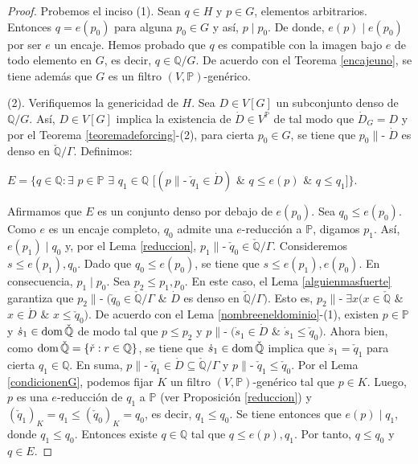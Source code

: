 \documentclass[11pt]{unam_tesis1}
\theoremstyle{MyThmStyle}
\theoremstyle{definition}
\theoremstyle{plain}
\theoremstyle{remark}
\def\dom{\mathop{\rm dom}\nolimits}
\def\forces{\mathop{\parallel\!\!\!-}\nolimits}
\let\Vdash\forces
\let\leq\leqslant
\begin{document}
\begin{proof}
Probemos el inciso (1). Sean $q \in H$ y $p \in G$, elementos arbitrarios. Entonces $q=e(p_0)$ para alguna $p_0\in G$ y as\'i, $p\mid p_0$. De donde, $e(p)\mid e(p_0)$ por ser $e$ un encaje. Hemos probado que $q$ es compatible con la imagen bajo $e$ de todo elemento en $G$, es decir, $q\in \mathbb Q/G$. De acuerdo con el Teorema \ref{encajeuno}, se tiene adem\'as que $G$ es un filtro $(V,\mathbb P)$-gen\'erico.

(2). Verifiquemos la genericidad de $H$. Sea $D\in V[G]$ un subconjunto denso de $\mathbb Q/G$. As\'i, $D \in V[G]$ implica la existencia de $\dot D\in V^{\mathbb P}$ de tal modo que $\dot D_G = D$ y por el Teorema \ref{teoremadeforcing}-(2), para cierta $p_0\in G$, se tiene que $p_0\Vdash \dot D$ es denso en $\mathbb{\check{\mathbb Q}}/\Gamma$. Definimos:
\begin{center}
$E=\{q\in \mathbb Q:\exists$ $p\in \mathbb P$ $\exists$ $q_1\in \mathbb Q$ $[(p\Vdash \check q_1\in \dot D)$ $\&$ $q\leq e(p)$ $\&$ $q\leq q_1] \}$.
\end{center}
Afirmamos que $E$ es un conjunto denso por debajo de $e(p_0)$. Sea $q_0\leq e(p_0)$. Como $e$ es un encaje completo, $q_0$ admite una $e$-reducci\'on a $\mathbb P$, digamos $p_1$. As\'i, $e(p_1)\mid q_0$ y, por el Lema \ref{reduccion}, $p_1\Vdash \check q_0\in \check{\mathbb Q}/\Gamma$. Consideremos $s\leq e(p_1),q_0$. Dado que $q_0\leq e(p_0)$, se tiene que $s\leq e(p_1),e(p_0)$. En consecuencia, $p_1\mid p_0$. Sea $p_2\leq p_1,p_0$. En este caso, el Lema \ref{alguienmasfuerte} garantiza que $p_2\Vdash (\check q_0\in \check{\mathbb Q}/\Gamma$ $\&$ $\dot D$ es denso en $\check{\mathbb Q}/\Gamma)$. Esto es, $p_2\Vdash \exists x(x\in \check{\mathbb Q}$ $\&$ $x\in \dot D$ $\&$ $x\leq \check q_0)$. De acuerdo con el Lema \ref{nombreeneldominio}-(1), existen $p\in \mathbb P$ y $\dot s_1\in \dom \check{\mathbb Q}$ de modo tal que $p\leq p_2$ y $p\Vdash (\dot s_1\in \dot D$ $\&$ $\dot s_1\leq \check q_0)$. Ahora bien, como $\dom \check{\mathbb Q}=\{\check r:r\in \mathbb Q \}$, se tiene que $\dot s_1\in \dom \check{\mathbb Q}$ implica que $\dot s_1=\check q_1$ para cierta $q_1\in \mathbb Q$. En suma, $p\Vdash \check q_1\in \dot D\subseteq \check{\mathbb Q}/\Gamma$ y $p\Vdash \check q_1\leq \check q_0$. Por el Lema \ref{condicionenG}, podemos fijar $K$ un filtro $(V,\mathbb P)$-gen\'erico tal que $p\in K$. Luego, $p$ es una $e$-reducci\'on de $q_1$ a $\mathbb P$ (ver Proposici\'on \ref{reduccion}) y $(\check q_1)_K=q_1\leq (\check q_0)_K=q_0$, es decir, $q_1\leq q_0$. Se tiene entonces que $e(p)\mid q_1$, donde $q_1\leq q_0$. Entonces existe $q\in \mathbb Q$ tal que $q\leq e(p),q_1$. Por tanto, $q\leq q_0$ y $q\in E$.


\end{proof}
\end{document}
